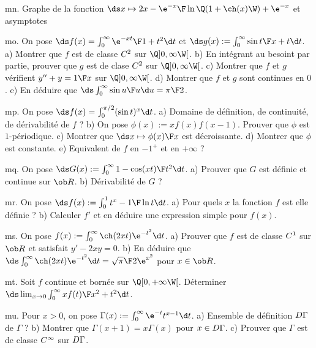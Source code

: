 \exo [Level=1,Fight=1,Learn=0,Type=\Exercices,Field=\Fonctions,Origin=] mn. 
Graphe de la fonction $\ds x\mapsto {2x-\e^{-x}\F\ln\Q(1+\ch(x)\W)+\e^{-x}}$ et asymptotes

\exo [Level=2,Fight=2,Learn=2,Type=\Exercices,Field=\FonctionsDéfiniesParUneIntégrale,Origin=] mo. 
On pose $\ds f(x)=\int_0^\infty{\e^{-xt}\F1+t^2}\d t$ et $\ds g(x):=\int_0^\infty{\sin t\F x+t}\d t$. \pn
a) Montrer que $f$ est de classe $\sc C^2$ sur $\Q]0,\infty\W[$. \pn
b) En intégrant au besoint par partie, prouver que $g$ est de clase $\sc C^2$ sur $\Q]0,\infty\W[$. \pn
c) Montrer que $f$ et $g$ vérifient $y''+y={1\F x}$ sur $\Q]0,\infty\W[$. \pn
d) Montrer que $f$ et $g$ sont continues en $0$. \pn
e) En déduire que $\ds\int_0^\infty{\sin u\F u}\d u={\pi\F 2}$. 

\exo [Level=2,Fight=2,Learn=2,Type=\Exercices,Field=\FonctionsDéfiniesParUneIntégrale,Origin=] mp. 
On pose $\ds f(x)=\int_0^{\pi/2}(\sin t)^x\d t$. \pn
a) Domaine de définition, de continuité, de dérivabilité de $f$ ? \pn
b) On pose $\phi(x):=xf(x)f(x-1)$. Prouver que $\phi$ est $1$-périodique. \pn
c) Montrer que $\ds x\mapsto{\phi(x)\F x}$ est décroissante. \pn
d) Montrer que $\phi$ est constante. \pn
e) Equivalent de $f$ en $-1^+$ et en $+\infty$ ? 

\exo [Level=2,Fight=1,Learn=2,Type=\Exercices,Field=\FonctionsDéfiniesParUneIntégrale,Origin=] mq. 
On pose $\ds G(x):=\int_0^\infty{1-\cos(xt)\F t^2}\d t$. \pn
a) Prouver que $G$ est définie et continue sur $\ob R$. \pn
b) Dérivabilité de $G$ ?

\exo [Level=2,Fight=1,Learn=2,Type=\Exercices,Field=\FonctionsDéfiniesParUneIntégrale,Origin=] mr. 
On pose $\ds f(x):=\int_0^1{t^x-1\F\ln t}\d t$. \pn
a) Pour quels $x$ la fonction $f$ est elle définie ? \pn
b) Calculer $f'$ et en déduire une expression simple pour $f(x)$. 

\exo [Level=2,Fight=1,Learn=2,Type=\Exercices,Field=\FonctionsDéfiniesParUneIntégrale,Origin=] ms. 
On pose $f(x):=\int_0^\infty\ch(2xt)\e^{-t^2}\d t$. \pn
a) Prouver que $f$ est de classe $\sc C^1$ sur $\ob R$ et satisfait $y'-2xy=0$. \pn
b) En déduire que $\ds \int_0^\infty\ch(2xt)\e^{-t^2}\d t={\sqrt\pi\F 2}\e^{x^2}$ pour $x\in\ob R$. 

\exo [Level=2,Fight=1,Learn=2,Type=\Exercices,Field=\FonctionsDéfiniesParUneIntégrale,Origin=] mt. 
Soit $f$ continue et bornée sur $\Q[0,+\infty\W[$. Déterminer $\ds\lim_{x\to0}\int_0^\infty{xf(t)\F x^2+t^2}\d t$. 

\exo [Level=2,Fight=2,Learn=2,Type=\Exercices,Field=\FonctionsDéfiniesParUneIntégrale,Origin=] mu. 
Pour $x>0$, on pose $\Gamma(x):=\int_0^\infty\e^{-t}t^{x-1}\d t$. \pn
a) Ensemble de définition $\sc D\Gamma$ de $\Gamma$ ? \pn 
b) Montrer que $\Gamma(x+1)=x\Gamma(x)$ pour $x\in\sc D\Gamma$. \pn
c) Prouver que $\Gamma$ est de classe $\sc C^\infty$ sur $\sc D\Gamma$. 


